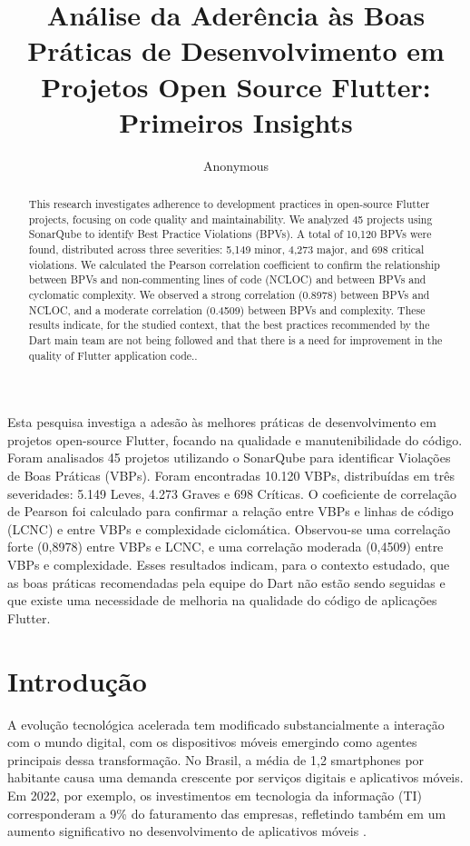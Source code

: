 \documentclass[12pt]{article}
\title{Análise da Aderência às Boas Práticas de Desenvolvimento em Projetos Open Source Flutter: Primeiros Insights}
\author{Anonymous\inst{1}}
\begin{document}
 

\maketitle

\begin{abstract}
This research investigates adherence to development practices in open-source Flutter projects, focusing on code quality and maintainability. We analyzed 45 projects using SonarQube to identify Best Practice Violations (BPVs). A total of 10,120 BPVs were found, distributed across three severities: 5,149 minor, 4,273 major, and 698 critical violations. We calculated the Pearson correlation coefficient to confirm the relationship between BPVs and non-commenting lines of code (NCLOC) and between BPVs and cyclomatic complexity. We observed a strong correlation (0.8978) between BPVs and NCLOC, and a moderate correlation (0.4509) between BPVs and complexity. These results indicate, for the studied context, that the best practices recommended by the Dart main team are not being followed and that there is a need for improvement in the quality of Flutter application code..
\end{abstract}
     
\begin{resumo} 
Esta pesquisa investiga a adesão às melhores práticas de desenvolvimento em projetos open-source Flutter, focando na qualidade e manutenibilidade do código. Foram analisados 45 projetos utilizando o SonarQube para identificar Violações de Boas Práticas (VBPs). Foram encontradas 10.120 VBPs, distribuídas em três severidades: 5.149 Leves, 4.273 Graves e 698 Críticas. O coeficiente de correlação de Pearson foi calculado para confirmar a relação entre VBPs e linhas de código (LCNC) e entre VBPs e complexidade ciclomática. Observou-se uma correlação forte (0,8978) entre VBPs e LCNC, e uma correlação moderada (0,4509) entre VBPs e complexidade. Esses resultados indicam, para o contexto estudado, que as boas práticas recomendadas pela equipe do Dart não estão sendo seguidas e que existe uma necessidade de melhoria na qualidade do código de aplicações Flutter.
\end{resumo}

\section{Introdução}
A evolução tecnológica acelerada tem modificado substancialmente a interação com o mundo digital, com os dispositivos móveis emergindo como agentes principais dessa transformação. No Brasil, a média de 1,2 smartphones por habitante causa uma demanda crescente por serviços digitais e aplicativos móveis. Em 2022, por exemplo, os investimentos em tecnologia da informação (TI) corresponderam a 9\% do faturamento das empresas, refletindo também em um aumento significativo no desenvolvimento de aplicativos móveis \cite{FGVcia2023}.
\end{document}
